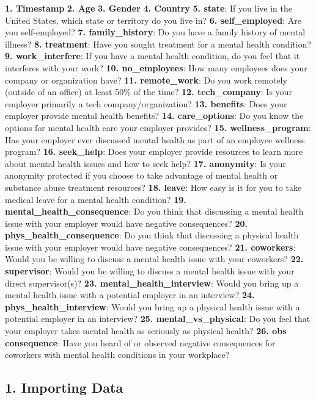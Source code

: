 \documentclass[11pt]{article}
\begin{document}
\textbf{1. Timestamp} \textbf{2. Age} \textbf{3. Gender} \textbf{4.
Country} \textbf{5. state}: If you live in the United States, which
state or territory do you live in? \textbf{6. self\_employed}: Are you
self-employed? \textbf{7. family\_history}: Do you have a family history
of mental illness? \textbf{8. treatment}: Have you sought treatment for
a mental health condition? \textbf{9. work\_interfere}: If you have a
mental health condition, do you feel that it interferes with your work?
\textbf{10. no\_employees}: How many employees does your company or
organization have? \textbf{11. remote\_work}: Do you work remotely
(outside of an office) at least 50\% of the time? \textbf{12.
tech\_company}: Is your employer primarily a tech company/organization?
\textbf{13. benefits}: Does your employer provide mental health
benefits? \textbf{14. care\_options}: Do you know the options for mental
health care your employer provides? \textbf{15. wellness\_program}: Has
your employer ever discussed mental health as part of an employee
wellness program? \textbf{16. seek\_help}: Does your employer provide
resources to learn more about mental health issues and how to seek help?
\textbf{17. anonymity}: Is your anonymity protected if you choose to
take advantage of mental health or substance abuse treatment resources?
\textbf{18. leave}: How easy is it for you to take medical leave for a
mental health condition? \textbf{19. mental\_health\_consequence}: Do
you think that discussing a mental health issue with your employer would
have negative consequences? \textbf{20. phys\_health\_consequence}: Do
you think that discussing a physical health issue with your employer
would have negative consequences? \textbf{21. coworkers}: Would you be
willing to discuss a mental health issue with your coworkers?
\textbf{22. supervisor}: Would you be willing to discuss a mental health
issue with your direct supervisor(s)? \textbf{23.
mental\_health\_interview}: Would you bring up a mental health issue
with a potential employer in an interview? \textbf{24.
phys\_health\_interview}: Would you bring up a physical health issue
with a potential employer in an interview? \textbf{25.
mental\_vs\_physical}: Do you feel that your employer takes mental
health as seriously as physical health? \textbf{26. obs consequence}:
Have you heard of or observed negative consequences for coworkers with
mental health conditions in your workplace?

    \hypertarget{importing-data}{%
\subsection{1. Importing Data}\label{importing-data}}
\end{document}
